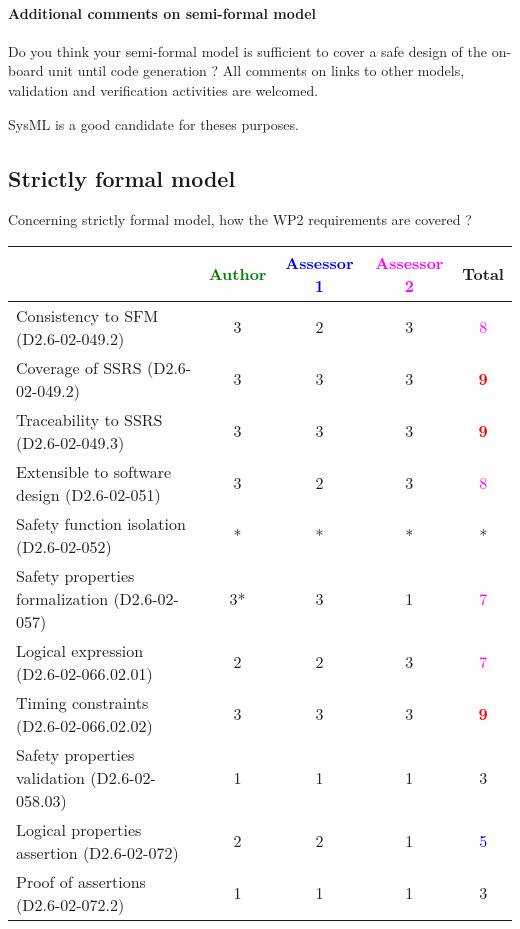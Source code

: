\paragraph{Additional comments on semi-formal  model} Do you think your semi-formal  model is sufficient to cover a safe design of the on-board unit until code generation ?
All comments on links to  other models, validation and verification activities are welcomed.
\begin{author_comment}
SysML \cite{sysmlbook} is a good candidate for theses purposes.
\end{author_comment}
\subsection{Strictly formal model}

Concerning strictly formal model, how the WP2 requirements are covered ?

\begin{tabular}{|l | c | c | c | c|}
\hline
& \textcolor{green}{Author} & \textcolor{blue}{Assessor 1} & \textcolor{magenta}{Assessor 2} & Total \\
\hline 
Consistency to SFM (D2.6-02-049.2) &3 & 2   & 3    & \textcolor{magenta}{8} \\
\hline
Coverage of SSRS (D2.6-02-049.2)  & 3   & 3   & 3   & \textcolor{red}{\textbf{9}} \\
\hline
Traceability to  SSRS (D2.6-02-049.3)  & 3   & 3   & 3   & \textcolor{red}{\textbf{9}} \\
\hline
Extensible to software design (D2.6-02-051)  &3 & 2   & 3   & \textcolor{magenta}{8}  \\
\hline
Safety function isolation (D2.6-02-052)  & *  & * & * & * \\
\hline 
Safety properties formalization (D2.6-02-057)  &3* & 3    & 1    & \textcolor{magenta}{7} \\
\hline
Logical expression (D2.6-02-066.02.01)  &2 & 2   & 3    & \textcolor{magenta}{7}  \\
\hline
Timing constraints (D2.6-02-066.02.02)  &3 & 3   & 3   & \textcolor{red}{\textbf{9}} \\
\hline
Safety properties validation (D2.6-02-058.03)  &1 & 1   & 1   &  3 \\
\hline
Logical properties assertion (D2.6-02-072)  &2 & 2   & 1   & \textcolor{blue}{5} \\
\hline
Proof of assertions (D2.6-02-072.2)  &1 & 1   & 1   & 3    \\
\hline
\end{tabular}

